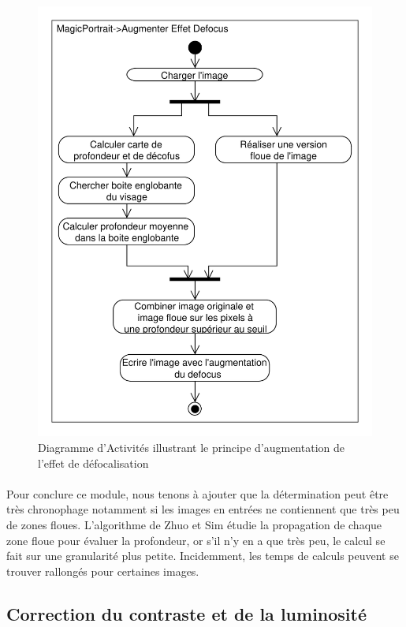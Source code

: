 \documentclass[11pt, french,screen]{report-rd-info}
\begin{document}
\begin{figure}
\centering
\includegraphics[scale=0.5]{Diagrammes/DiagrammeActivites_20_Profondeur}
\caption{Diagramme d'Activités illustrant le principe d'augmentation de l'effet de défocalisation}
\label{diag:diagramme20}
\end{figure}

\paragraph*{}
Pour conclure ce module, nous tenons à ajouter que la détermination peut être très chronophage notamment si les images en entrées ne contiennent que très peu de zones floues. L'algorithme de Zhuo et Sim \cite{Zhuo2011} étudie la propagation de chaque zone floue pour évaluer la profondeur, or s'il n'y en a que très peu, le calcul se fait sur une granularité plus petite. Incidemment, les temps de calculs peuvent se trouver rallongés pour certaines images. 

\subsection{Correction du contraste et de la luminosité}
\end{document}
